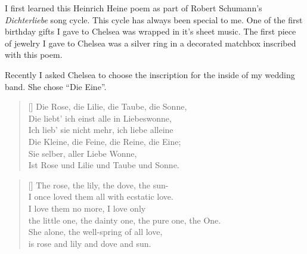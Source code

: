 I first learned this Heinrich Heine poem as part of Robert Schumann's {\it
Dichterliebe} song cycle. This cycle has always been special to me. One of the
first birthday gifts I gave to Chelsea was wrapped in it's sheet music.  The
first piece of jewelry I gave to Chelsea was a silver ring in a decorated
matchbox inscribed with this poem.

Recently I asked Chelsea to choose the inscription for the inside of my
wedding band. She chose ``Die Eine''.

\settowidth{\versewidth}{the little one, the dainty one, the pure one, the One.}
\begin{verse}[\versewidth]
Die Rose, die Lilie, die Taube, die Sonne,\\
Die liebt' ich einst alle in Liebeswonne,\\
Ich lieb' sie nicht mehr, ich liebe alleine\\
Die Kleine, die Feine, die Reine, die Eine;\\
Sie selber, aller Liebe Wonne,\\
Ist Rose und Lilie und Taube und Sonne.\\
\end{verse}
\settowidth{\versewidth}{the little one, the dainty one, the pure one, the One.}
\begin{verse}[\versewidth]
The rose, the lily, the dove, the sun-\\
I once loved them all with ecstatic love.\\
I love them no more, I love only\\
the little one, the dainty one, the pure one, the One.\\
She alone, the well-spring of all love,\\
is rose and lily and dove and sun.\\
\end{verse}
